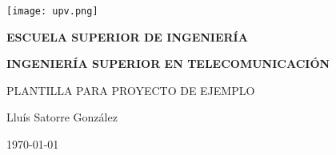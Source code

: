 

\begin{titlepage}

  \begin{center}

    \texttt{[image: upv.png]} \\
    
    \vspace{2.0cm}
    
    \LARGE{\textbf{ESCUELA SUPERIOR DE INGENIERÍA}} \\
    
    \vspace{1.0cm}
    
    \Large{\textbf{INGENIERÍA SUPERIOR EN TELECOMUNICACIÓN}} \\
    
    \vspace{3.0cm}
    
    \Large{PLANTILLA PARA PROYECTO DE EJEMPLO} \\
    
    \vspace{2.0cm}
    
    \Large{Lluís Satorre González} \\
  
    \vspace{0.5cm}

    \large{\today}
    
  \end{center}
\end{titlepage}
